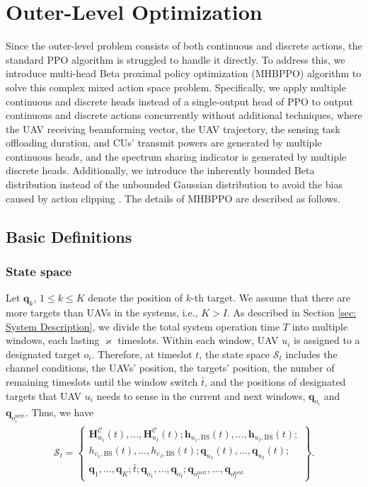 \documentclass[10pt,journal,compsoc]{IEEEtran}
\begin{document}
\section{Outer-Level Optimization}\label{sec:outer-level-optimization}
Since the outer-level problem consists of both continuous and discrete actions, the standard PPO algorithm is struggled to handle it directly.
To address this, we introduce multi-head Beta proximal policy optimization (MHBPPO) algorithm to solve this complex mixed action space problem.
Specifically, we apply multiple continuous and discrete heads instead of a single-output head of PPO to output continuous and discrete actions concurrently without additional techniques,
where the UAV receiving beamforming vector, the UAV trajectory, the sensing task offloading duration, and CUs' transmit powers are generated by multiple continuous heads,
and the spectrum sharing indicator is generated by multiple discrete heads.
Additionally, we introduce the inherently bounded Beta distribution instead of the unbounded Gaussian distribution to avoid the bias caused by action clipping \cite{c4:Beta-distribution}.
The details of MHBPPO are described as follows.
\subsection{Basic Definitions}
\subsubsection{State space}
Let $\bm{q}_{k}$, $1 \le k \le K$ denote the position of $k$-th target. We assume that there are more targets than UAVs in the systems, i.e., $K > I$. 
As described in Section \ref{sec: System Description}, we divide the total system operation time $T$ into multiple windows, each lasting $\varkappa$ timeslots. 
Within each window, UAV $u_{i}$ is assigned to a designated target $o_{i}$. 
Therefore, at timeslot $t$, the state space $\mathcal{S}_{t}$ includes the channel conditions, the UAVs' position, the targets' position, the number of remaining timeslots until the window switch $\bar{t}$, and the positions of designated targets that UAV $u_{i}$ needs to sense in the current and next windows, $\bm{q}_{o_{i}}$ and $\bm{q}_{o^{\text{next}}_{i}}$. 
Thus, we have
\begin{align}\label{c5:State-Sapce}
    \mathcal{S}_{t} =
    \begin{Bmatrix}
        \mathbf{H}_{u_{1}}^{\mathcal{C}}(t), \dots, \mathbf{H}_{u_{I}}^{\mathcal{C}}(t); \bm{h}_{u_{1}, \mathrm{BS}}(t), \dots, \bm{h}_{u_{I}, \mathrm{BS}}(t); \\
        h_{c_{1}, \mathrm{BS}}(t), \dots, h_{c_{J}, \mathrm{BS}}(t); \bm{q}_{u_{1}}(t), \dots, \bm{q}_{u_{I}}(t); \\
        \bm{q}_{1}, \dots, \bm{q}_{K}; \bar{t};\bm{q}_{o_{1}}, \dots, \bm{q}_{o_{I}}; \bm{q}_{o^{\text{next}}_{1}}, \dots, \bm{q}_{o^{\text{next}}_{I}}
    \end{Bmatrix}.
\end{align}
\end{document}

